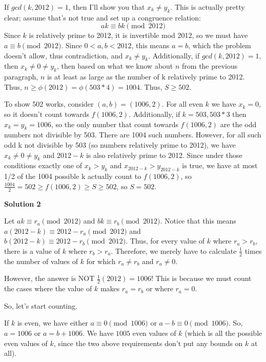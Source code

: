 \begin{enumerate}
 If $gcd(k, 2012)=1$, then I'll show you that $x_k \neq y_k$. This is actually pretty clear; assume that's not true and set up a congruence relation:
 \[ak \equiv bk \pmod {2012}\]Since $k$ is relatively prime to 2012, it is invertible mod 2012, so we must have $a \equiv b \pmod {2012}$. Since $0 < a, b <2012$, this means $a=b$, which the problem doesn't allow, thus contradiction, and $x_k \neq y_k$. Additionally, if $gcd(k, 2012)=1$, then $x_k \neq 0 \neq y_k$, then based on what we know about $n$ from the previous paragraph, $n$ is at least as large as the number of k relatively prime to 2012. Thus, $n \geq \phi(2012) = \phi(503*4) = 1004$. Thus, $S \geq 502$.

 To show 502 works, consider $(a, b)=(1006, 2)$. For all even $k$ we have $x_k=0$, so it doesn't count towards $f(1006, 2)$. Additionally, if $k = 503, 503*3$ then $x_k = y_k = 1006$, so the only number that count towards $f(1006, 2)$ are the odd numbers not divisible by 503. There are 1004 such numbers. However, for all such odd k not divisible by 503 (so numbers relatively prime to 2012), we have $x_k \neq 0 \neq y_k$ and $2012-k$ is also relatively prime to 2012. Since under those conditions exactly one of $x_k > y_k$ and $x_{2012-k} > y_{2012-k}$ is true, we have at most 1/2 of the 1004 possible k actually count to $f(1006, 2)$, so $\frac{1004}{2} = 502 \geq f(1006, 2) \geq S \geq 502$, so $S=502$.

 



\textbf{Solution 2}

Let $ak \equiv r_{a} \pmod{2012}$ and $bk \equiv r_{b} \pmod{2012}$. Notice that this means $a(2012 - k) \equiv 2012 - r_{a} \pmod{2012}$ and $b(2012 - k) \equiv 2012 - r_{b} \pmod{2012}$. Thus, for every value of $k$ where $r_{a} > r_{b}$, there is a value of $k$ where $r_{b} > r_{a}$. Therefore, we merely have to calculate $\frac{1}{2}$ times the number of values of $k$ for which $r_{a} \neq r_{b}$ and $r_{a} \neq 0$.

 
However, the answer is NOT $\frac{1}{2}(2012) = 1006$! This is because we must count the cases where the value of $k$ makes $r_{a} = r_{b}$ or where $r_{a} = 0$.

 
So, let's start counting.

 
If $k$ is even, we have either $a \equiv 0 \pmod{1006}$ or $a - b \equiv 0 \pmod{1006}$. So, $a = 1006$ or $a = b + 1006$. We have $1005$ even values of $k$ (which is all the possible even values of $k$, since the two above requirements don't put any bounds on $k$ at all).


\end{enumerate}
